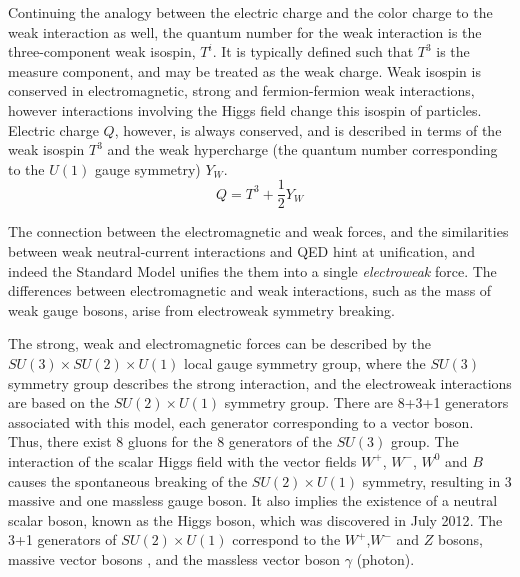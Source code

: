 \documentclass[12pt,a4paper,openright,twoside]{report}
\begin{document}
Continuing the analogy between the electric charge and the color charge to the weak interaction as well, the quantum number for the weak interaction is the three-component weak isospin, $T^i$. It is typically defined such that $T^3$ is the measure component, and may be treated as the weak charge. Weak isospin is conserved in electromagnetic, strong and fermion-fermion weak interactions, however interactions involving the Higgs field change this isospin of particles. Electric charge $Q$, however, is always conserved, and is described in terms of the weak isospin $T^3$ and the weak hypercharge (the quantum number corresponding to the $U(1)$ gauge symmetry) $Y_W$.
$$
Q = T^3 + \frac{1}{2}Y_W
$$

The connection between the electromagnetic and weak forces, and the similarities between weak neutral-current interactions and QED hint at unification, and indeed the Standard Model unifies the them into a single \textit{electroweak} force. The differences between electromagnetic and weak interactions, such as the mass of weak gauge bosons, arise from electroweak symmetry breaking.

The strong, weak and electromagnetic forces can be described by the $SU(3)\times SU(2)\times U(1)$ local gauge symmetry group, where the $SU(3)$ symmetry group describes the strong interaction, and the electroweak interactions are based on the $SU(2)\times U(1)$ symmetry group. There are 8+3+1 generators associated with this model, each generator corresponding to a vector boson. Thus, there exist 8 gluons for the 8 generators of the $SU(3)$ group. The interaction of the scalar Higgs field with the vector fields $W^+$, $W^-$, $W^0$ and $B$ causes the spontaneous breaking of the $SU(2)\times U(1)$ symmetry, resulting in 3 massive and one massless gauge boson. It also implies the existence of a neutral scalar boson, known as the Higgs boson, which was discovered in July 2012\cite{Higgs,Higgs2}. The 3+1 generators of $SU(2)\times U(1)$ correspond to the $W^+$,$W^-$ and $Z$ bosons, massive vector bosons , and the massless vector boson $\gamma$ (photon).
\end{document}
